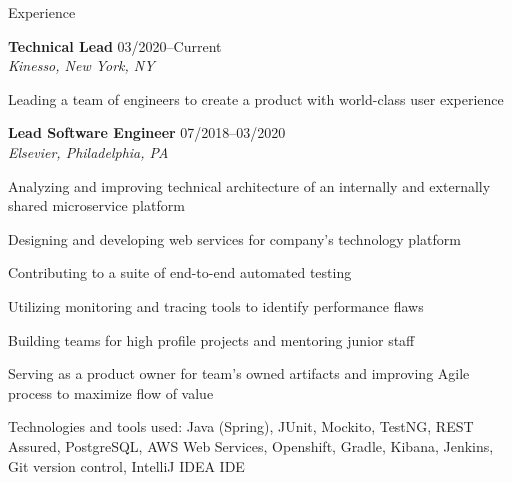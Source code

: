 \begin{Large}\textsf{Experience}\end{Large} \vspace{-2mm}

\begin{itemize1}
	\item \textbf{Technical Lead} \textopenbullet{} 03/2020--Current \\
		\textit{Kinesso, New York, NY} \vspace{-1.5mm}
		\begin{itemize1}
			\item Leading a team of engineers to create a product with world-class user experience
		\end{itemize1}
\end{itemize1}

\begin{itemize1}
	\item \textbf{Lead Software Engineer} \textopenbullet{} 07/2018--03/2020 \\
		\textit{Elsevier, Philadelphia, PA} \vspace{-1.5mm}
		\begin{itemize1}
			\item Analyzing and improving technical architecture of an internally and externally shared microservice platform
			\item Designing and developing web services for company's technology platform
			\item Contributing to a suite of end-to-end automated testing 
			\item Utilizing monitoring and tracing tools to identify performance flaws
			\item Building teams for high profile projects and mentoring junior staff
			\item Serving as a product owner for team's owned artifacts and improving Agile process to maximize flow of value
			\item Technologies and tools used: Java (Spring), JUnit, Mockito, TestNG, REST Assured, PostgreSQL, AWS Web Services, Openshift, Gradle, Kibana, Jenkins, Git version control, IntelliJ IDEA IDE
		\end{itemize1}
\end{itemize1}

